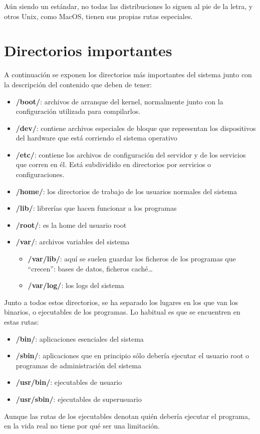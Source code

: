Aún siendo un estándar, no todas las distribuciones lo siguen al pie de la letra, y otros Unix, como MacOS, tienen sus propias rutas especiales.


\section{Directorios importantes}
A continuación se exponen los directorios más importantes del sistema junto con la descripción del contenido que deben de tener:
\begin{itemize}

    \item \textbf{/boot/}: archivos de arranque del kernel, normalmente junto con la configuración utilizada para compilarlos.
    \item \textbf{/dev/}: contiene archivos especiales de bloque que representan los dispositivos del hardware que está corriendo el sistema operativo
    \item \textbf{/etc/}: contiene los archivos de configuración del servidor y de los servicios que corren en él. Está subdividido en directorios por servicios o configuraciones.
    \item \textbf{/home/}: los directorios de trabajo de los usuarios normales del sistema
    \item \textbf{/lib/}: librerías que hacen funcionar a los programas
    \item \textbf{/root/}: es la home del usuario root
    \item \textbf{/var/}: archivos variables del sistema
    \begin{itemize}
      \item \textbf{/var/lib/}: aquí se suelen guardar los ficheros de los programas que “crecen”: bases de datos, ficheros caché…
      \item \textbf{/var/log/}: los logs del sistema
    \end{itemize}
\end{itemize}

Junto a todos estos directorios, se ha separado los lugares en los que van los binarios, o ejecutables de los programas. Lo habitual es que se encuentren en estas rutas:

\begin{itemize}
    \item \textbf{/bin/}: aplicaciones esenciales del sistema
    \item \textbf{/sbin/}: aplicaciones que en principio sólo debería ejecutar el usuario root o programas de administración del sistema
    \item \textbf{/usr/bin/}: ejecutables de usuario
    \item \textbf{/usr/sbin/}: ejecutables de superusuario
\end{itemize}
Aunque las rutas de los ejecutables denotan quién debería ejecutar el programa, en la vida real no tiene por qué ser una limitación.


